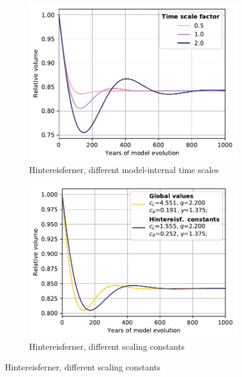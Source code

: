   \begin{figure}[ht]
    \centering
    \begin{subfigure}[b]{0.476\textwidth}
      \caption{Hintereisferner, different model-internal time scales}
      \label{fig:sensitivity:time_scales_hef}
      \centering
      \includegraphics[width=\textwidth]{../plots/final_plots/sensitivity/time_scales_hef.pdf}
    \end{subfigure}
    \hfill
    \begin{subfigure}[b]{0.476\textwidth}
      \caption{Hintereisferner, different scaling constants}
      \label{fig:sensitivity:scaling_params_hef}
      \centering
      \includegraphics[width=\textwidth]{../plots/final_plots/sensitivity/scaling_params_hef.pdf}
    \end{subfigure}
    

\end{figure}
